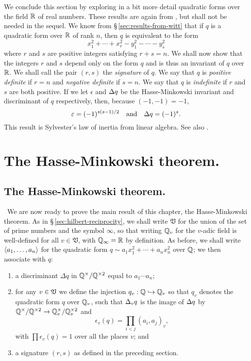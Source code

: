 We conclude this section by exploring in a bit more detail quadratic forms over the field \(\mathbb{R}\) of real numbers. These results are again from \cite{serre2012course}, but shall not be needed in the sequel. We know from \S\,\ref{sec:results-from-witt} that if \(q\) is a quadratic form over \(\mathbb{R}\) of rank \(n\), then \(q\) is equivalent to the form
\[
    x_1^2 + \cdots + x_{r}^2 - y_1^2 - \cdots - y_{s}^2
\]
where \(r\) and \(s\) are positive integers satisfying \(r + s = n\). We shall now show that the integers \(r\) and \(s\) depend only on the form \(q\) and is thus an invariant of \(q\) over \(\mathbb{R}\). We shall call the pair \((r,s)\) the \emph{signature} of \(q\). We say that \(q\) is \emph{positive definite} if \(r = n\) and \emph{negative definite} if \(s = n\). We say that \(q\) is \emph{indefinite} if \(r\) and \(s\) are both positive. If we let \(\epsilon\) and \({\Delta} q\) be the Hasse-Minkowski invariant and discriminant of \(q\) respectively, then, because \((-1, -1) = -1\),
\[
    \varepsilon = (-1)^{s(s-1)/2} \quad \text{and} \quad {\Delta} q = (-1)^{s}.
\]
This result is Sylvester's law of inertia from linear algebra. See also \cite[pp.~83--84]{szymiczek2017bilinear}.

\section{The Hasse-Minkowski theorem.}

\subsection{The Hasse-Minkowski theorem.}~We are now ready to prove the main result of this chapter, the Hasse-Minkowski theorem. As in \S\,\ref{sec:hilbert-reciprocity}, we shall write \(\mathfrak{V}\) for the union of the set of prime numbers and the symbol \(\infty\), so that writing \(\mathbb{Q}_v\) for the \(v\)-adic field is well-defined for all \(v \in \mathfrak{V}\), with \(\mathbb{Q}_{\infty} = \mathbb{R}\) by definition. As before, we shall write \(\langle a_1, \dots, a_n \rangle\) for the quadratic form \(q \sim a_1x_1^2 + \cdots + a_nx_n^2\) over \(\mathbb{Q}\); we then associate with \(q\):\label{sec:hasse-minkowski} 

\smallskip

\begin{enumerate}[nosep, label=(\alph*)]
    \item a discriminant \(\Delta q\) in \(\mathbb{Q}^{\times} / \mathbb{Q}^{\times 2}\) equal to \(a_1 \cdots a_n\);
    \item for any \(v \in \mathfrak{V}\) we define the injection \(q_v : \mathbb{Q} \hookrightarrow \mathbb{Q}_v\) so that \(q_v\) denotes the quadratic form \(q\) over \(\mathbb{Q}_v\), such that \({\Delta}_v q\) is the image of \({\Delta} q\) by \(\mathbb{Q}^{\times} / \mathbb{Q}^{\times 2} \to \mathbb{Q}_v^{\times} / \mathbb{Q}_v^{\times2}\) and
    \[
      \epsilon_v (q) = \prod_{i < j} (a_i, a_j)_v,  
    \]
    with \(\prod \epsilon_v(q) = 1\) over all the places \(v\); and
    \item a signature \((r,s)\) as defined in the preceding section.
\end{enumerate}

